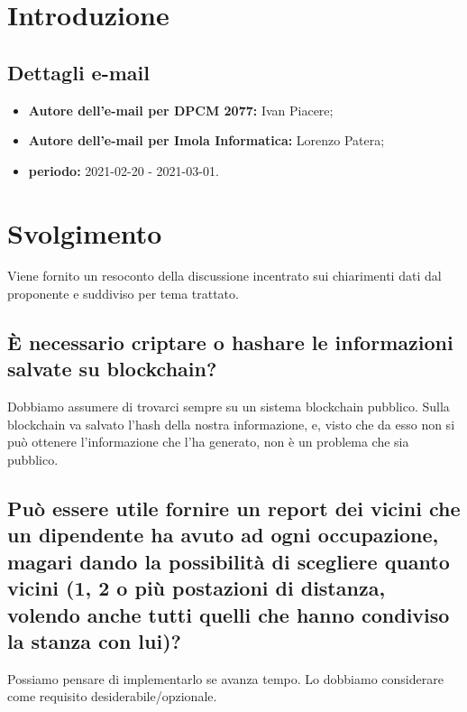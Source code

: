 \section*{Introduzione}
\subsection*{Dettagli e-mail}
\begin{itemize}
	\item \textbf{Autore dell'e-mail per DPCM 2077:} Ivan Piacere;
	\item \textbf{Autore dell'e-mail per Imola Informatica:} Lorenzo Patera;
	\item \textbf{periodo:} 2021-02-20 - 2021-03-01.
\end{itemize}

\section{Svolgimento}
Viene fornito un resoconto della discussione incentrato sui chiarimenti dati dal proponente e suddiviso per tema trattato.


\subsection*{È necessario criptare o hashare le informazioni salvate su blockchain?}
Dobbiamo assumere di trovarci sempre su un sistema blockchain pubblico.
Sulla blockchain va salvato l'hash della nostra informazione, e, visto che da esso non si può ottenere l'informazione che l'ha generato, non è un problema che sia pubblico.

\subsection*{Può essere utile fornire un report dei vicini che un dipendente ha avuto ad ogni occupazione, magari dando la possibilità di scegliere quanto vicini (1, 2 o più postazioni di distanza, volendo anche tutti quelli che hanno condiviso la stanza con lui)?}
Possiamo pensare di implementarlo se avanza tempo. Lo dobbiamo considerare come requisito desiderabile/opzionale.

